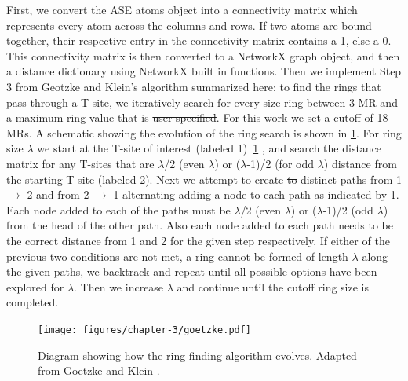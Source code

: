 \documentclass[preprint,numrefs,noinfo,sort&compress]{elsarticle}
\providecommand{\DIFadd}[1]{{\protect\color{blue}\uwave{#1}}} %
\providecommand{\DIFdel}[1]{{\protect\color{red}\sout{#1}}}                      %
\providecommand{\DIFaddbegin}{} %
\providecommand{\DIFaddend}{} %
\providecommand{\DIFdelbegin}{} %
\providecommand{\DIFdelend}{} %
\providecommand{\DIFaddbeginFL}{} %
\providecommand{\DIFaddendFL}{} %
\providecommand{\DIFdelbeginFL}{} %
\providecommand{\DIFdelendFL}{} %
\newcommand{\DIFscaledelfig}{0.5}
\newlength{\DIFdelgraphicswidth} %
\newlength{\DIFdelgraphicsheight} %
\newcommand{\DIFaddincludegraphics}[2][]{{\color{blue}\fbox{\DIFOincludegraphics[#1]{#2}}}} %
\newcommand{\DIFdelincludegraphics}[2][]{%
\sbox{\DIFdelgraphicsbox}{\DIFOincludegraphics[#1]{#2}}%
\settoboxwidth{\DIFdelgraphicswidth}{\DIFdelgraphicsbox} %
\settoboxtotalheight{\DIFdelgraphicsheight}{\DIFdelgraphicsbox} %
\scalebox{\DIFscaledelfig}{%
\parbox[b]{\DIFdelgraphicswidth}{\usebox{\DIFdelgraphicsbox}\\[-\baselineskip] \rule{\DIFdelgraphicswidth}{0em}}\llap{\resizebox{\DIFdelgraphicswidth}{\DIFdelgraphicsheight}{%
\setlength{\unitlength}{\DIFdelgraphicswidth}%
\begin{picture}(1,1)%
\thicklines\linethickness{2pt} %
{\color[rgb]{1,0,0}\put(0,0){\framebox(1,1){}}}%
{\color[rgb]{1,0,0}\put(0,0){\line( 1,1){1}}}%
{\color[rgb]{1,0,0}\put(0,1){\line(1,-1){1}}}%
\end{picture}%
}\hspace*{3pt}}} %
} %
\DeclareRobustCommand{\DIFaddbegin}{\DIFOaddbegin \let\includegraphics\DIFaddincludegraphics} %
\DeclareRobustCommand{\DIFaddend}{\DIFOaddend \let\includegraphics\DIFOincludegraphics} %
\DeclareRobustCommand{\DIFdelbegin}{\DIFOdelbegin \let\includegraphics\DIFdelincludegraphics} %
\DeclareRobustCommand{\DIFdelend}{\DIFOaddend \let\includegraphics\DIFOincludegraphics} %
\DeclareRobustCommand{\DIFaddbeginFL}{\DIFOaddbeginFL \let\includegraphics\DIFaddincludegraphics} %
\DeclareRobustCommand{\DIFaddendFL}{\DIFOaddendFL \let\includegraphics\DIFOincludegraphics} %
\DeclareRobustCommand{\DIFdelbeginFL}{\DIFOdelbeginFL \let\includegraphics\DIFdelincludegraphics} %
\DeclareRobustCommand{\DIFdelendFL}{\DIFOaddendFL \let\includegraphics\DIFOincludegraphics} %
\begin{document}
First, we convert the ASE atoms object into a connectivity matrix which represents every atom across the columns and rows. If two atoms are bound together, their respective entry in the connectivity matrix contains a 1, else a 0. This connectivity matrix is then converted to a NetworkX graph object, and then a distance dictionary using NetworkX built in functions. Then we implement Step 3 from Geotzke and Klein's algorithm \cite{goetzke-properties-1991} summarized here: to find the rings that pass through a T-site, we iteratively search for every size ring between 3-MR and a maximum ring value that is \DIFdelbegin \DIFdel{user specified}\DIFdelend \DIFaddbegin \DIFadd{user-specified}\DIFaddend . For this work we set a cutoff of 18-MRs. A schematic showing the evolution of the ring search is shown in \cref{fig:goetzke}. For ring size \(\lambda\) we start at the T-site of interest (labeled 1)\DIFdelbegin \DIFdel{\mbox{%
\cref{fig:goetzke}}\hskip0pt%
}\DIFdelend , and search the distance matrix for any T-sites that are \(\lambda\)/2 (even \(\lambda\)) or (\(\lambda\)-1)/2 (for odd \(\lambda\)) distance from the starting T-site (labeled 2). Next we attempt to create \DIFdelbegin \DIFdel{to }\DIFdelend \DIFaddbegin \DIFadd{two }\DIFaddend distinct paths from 1 \(\rightarrow\) 2 and from 2 \(\rightarrow\) 1 alternating adding a node to each path as indicated by \cref{fig:goetzke}. Each node added to each of the paths must be \(\lambda\)/2 (even \(\lambda\)) or (\(\lambda\)-1)/2 (odd \(\lambda\)) from the head of the other path. Also each node added to each path needs to be the correct distance from 1 and 2 for the given step respectively. If either of the previous two conditions are not met, a ring cannot be formed of length \(\lambda\) along the given paths, we backtrack and repeat until all possible options have been explored for \(\lambda\). Then we increase \(\lambda\) and continue until the cutoff ring size is completed.

\DIFdelbegin %
\DIFdelendFL \DIFaddbeginFL \begin{figure}[t]
\DIFaddendFL \centering
\DIFdelbeginFL %
\DIFdelendFL \DIFaddbeginFL \texttt{[image: figures/chapter-3/goetzke.pdf]}
\DIFaddendFL \caption{Diagram showing how the ring finding algorithm evolves. Adapted from Goetzke and Klein \cite{goetzke-properties-1991}. \label{fig:goetzke}}
\end{figure}
\DIFdelbegin %
\DIFdelend 
\end{document}

